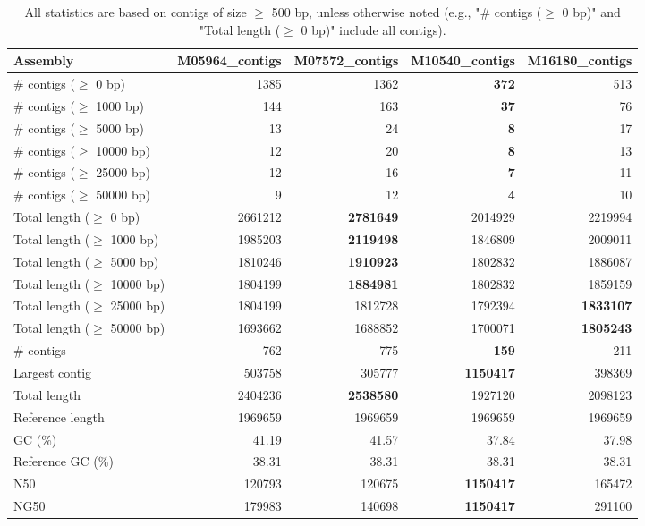 \documentclass[12pt,a4paper]{article}
\begin{document}
\begin{table}[ht]
\begin{center}
\caption{All statistics are based on contigs of size $\geq$ 500 bp, unless otherwise noted (e.g., "\# contigs ($\geq$ 0 bp)" and "Total length ($\geq$ 0 bp)" include all contigs).}
\begin{tabular}{|l*{4}{|r}|}
\hline
Assembly & M05964\_contigs & M07572\_contigs & M10540\_contigs & M16180\_contigs \\ \hline
\# contigs ($\geq$ 0 bp) & 1385 & 1362 & {\bf 372} & 513 \\ \hline
\# contigs ($\geq$ 1000 bp) & 144 & 163 & {\bf 37} & 76 \\ \hline
\# contigs ($\geq$ 5000 bp) & 13 & 24 & {\bf 8} & 17 \\ \hline
\# contigs ($\geq$ 10000 bp) & 12 & 20 & {\bf 8} & 13 \\ \hline
\# contigs ($\geq$ 25000 bp) & 12 & 16 & {\bf 7} & 11 \\ \hline
\# contigs ($\geq$ 50000 bp) & 9 & 12 & {\bf 4} & 10 \\ \hline
Total length ($\geq$ 0 bp) & 2661212 & {\bf 2781649} & 2014929 & 2219994 \\ \hline
Total length ($\geq$ 1000 bp) & 1985203 & {\bf 2119498} & 1846809 & 2009011 \\ \hline
Total length ($\geq$ 5000 bp) & 1810246 & {\bf 1910923} & 1802832 & 1886087 \\ \hline
Total length ($\geq$ 10000 bp) & 1804199 & {\bf 1884981} & 1802832 & 1859159 \\ \hline
Total length ($\geq$ 25000 bp) & 1804199 & 1812728 & 1792394 & {\bf 1833107} \\ \hline
Total length ($\geq$ 50000 bp) & 1693662 & 1688852 & 1700071 & {\bf 1805243} \\ \hline
\# contigs & 762 & 775 & {\bf 159} & 211 \\ \hline
Largest contig & 503758 & 305777 & {\bf 1150417} & 398369 \\ \hline
Total length & 2404236 & {\bf 2538580} & 1927120 & 2098123 \\ \hline
Reference length & 1969659 & 1969659 & 1969659 & 1969659 \\ \hline
GC (\%) & 41.19 & 41.57 & 37.84 & 37.98 \\ \hline
Reference GC (\%) & 38.31 & 38.31 & 38.31 & 38.31 \\ \hline
N50 & 120793 & 120675 & {\bf 1150417} & 165472 \\ \hline
NG50 & 179983 & 140698 & {\bf 1150417} & 291100 \\ \hline

\end{tabular}
\end{center}
\end{table}
\end{document}
